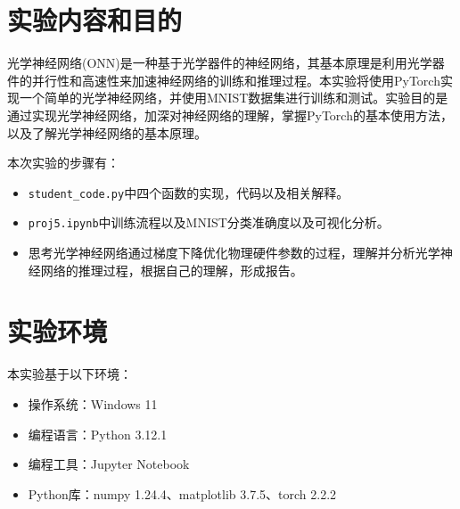 \section{实验内容和目的}

光学神经网络(ONN)是一种基于光学器件的神经网络，其基本原理是利用光学器件的并行性和高速性来加速神经网络的训练和推理过程。本实验将使用PyTorch实现一个简单的光学神经网络，并使用MNIST数据集进行训练和测试。实验目的是通过实现光学神经网络，加深对神经网络的理解，掌握PyTorch的基本使用方法，以及了解光学神经网络的基本原理。

本次实验的步骤有：

\begin{itemize}
    \item \texttt{student\_code.py}中四个函数的实现，代码以及相关解释。
    \item \texttt{proj5.ipynb}中训练流程以及MNIST分类准确度以及可视化分析。
    \item 思考光学神经网络通过梯度下降优化物理硬件参数的过程，理解并分析光学神经网络的推理过程，根据自己的理解，形成报告。
\end{itemize}

\section{实验环境}

本实验基于以下环境：

\begin{itemize}
    \item 操作系统：Windows 11
    \item 编程语言：Python 3.12.1
    \item 编程工具：Jupyter Notebook
    \item Python库：numpy 1.24.4、matplotlib 3.7.5、torch 2.2.2
\end{itemize}
